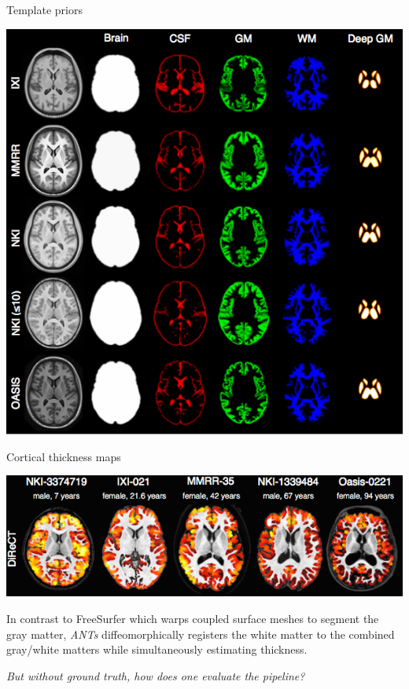 \documentclass[ignorenonframetext,]{beamer}
\begin{document}
\begin{frame}{Template priors}

\includegraphics{./evaluation/figures/templatePriors.png}

\end{frame}

\begin{frame}{Cortical thickness maps}

\includegraphics{./evaluation/figures/corticalThicknessEstimation.png}

In contrast to FreeSurfer which warps coupled surface meshes to segment
the gray matter, \emph{ANTs} diffeomorphically registers the white
matter to the combined gray/white matters while simultaneously
estimating thickness.

\end{frame}

\begin{frame}

\emph{But without ground truth, how does one evaluate the pipeline?}

\end{frame}
\end{document}
